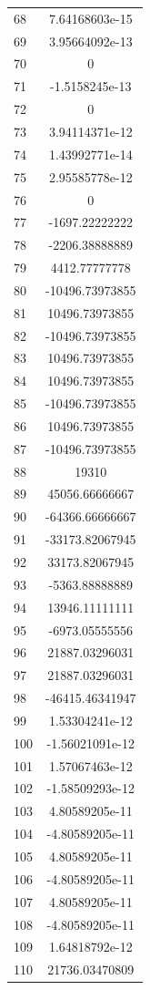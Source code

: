 \documentclass[]{article}
\begin{document}
\begin{longtable}{lc}
		68 & 7.64168603e-15 \\
		69 & 3.95664092e-13 \\
		70 & 0             \\
		71 & -1.5158245e-13 \\
		72 & 0             \\
		73 & 3.94114371e-12 \\
		74 & 1.43992771e-14 \\
		75 & 2.95585778e-12 \\
		76 & 0           \\
		77 & -1697.22222222 \\
		78 & -2206.38888889 \\
		79 & 4412.77777778  \\
		80 & -10496.73973855 \\
		81 & 10496.73973855 \\
		82 & -10496.73973855 \\
		83 & 10496.73973855 \\
		84 & 10496.73973855 \\
		85 & -10496.73973855 \\
		86 & 10496.73973855 \\
		87 & -10496.73973855 \\
		88 & 19310        \\
		89 & 45056.66666667 \\
		90 & -64366.66666667 \\
		91 & -33173.82067945 \\
		92 & 33173.82067945 \\
		93 & -5363.88888889 \\
		94 & 13946.11111111 \\
		95 & -6973.05555556 \\
		96 & 21887.03296031 \\
		97 & 21887.03296031 \\
		98 & -46415.46341947 \\
		99 & 1.53304241e-12 \\
		100 & -1.56021091e-12 \\
		101 & 1.57067463e-12 \\
		102 & -1.58509293e-12 \\
		103 & 4.80589205e-11 \\
		104 & -4.80589205e-11 \\
		105 & 4.80589205e-11 \\
		106 & -4.80589205e-11 \\
		107 & 4.80589205e-11 \\
		108 & -4.80589205e-11 \\
		109 & 1.64818792e-12 \\
		110 & 21736.03470809 \\
	
	\end{longtable}
	
\end{document}

